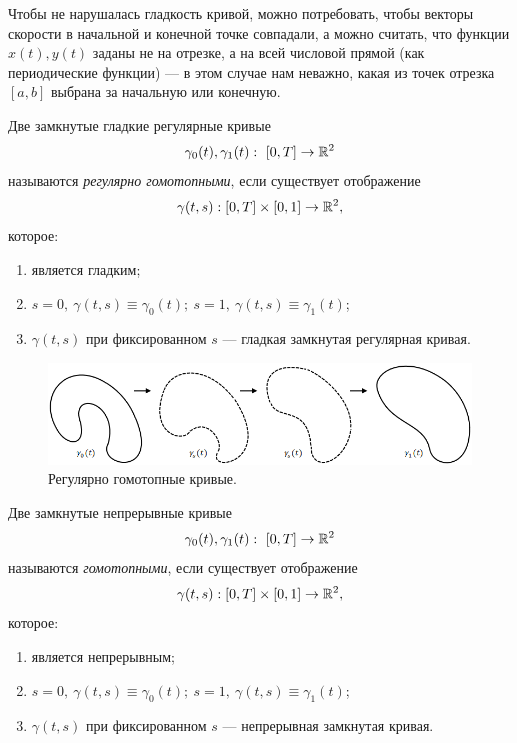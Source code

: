 \begin{remark}
    Чтобы не нарушалась гладкость кривой, можно потребовать, чтобы векторы скорости в начальной и конечной точке совпадали, а можно считать, что функции $x(t), y(t)$ заданы не на отрезке, а на всей числовой прямой (как периодические функции) — в этом случае нам неважно, какая из точек отрезка $[a,b]$ выбрана за начальную или конечную.
\end{remark}

\begin{definition}
    Две замкнутые гладкие регулярные кривые $$\gamma_0(t), \gamma_1(t): \ [0, T] \to \mathbb{R}^2$$ называются \textit{регулярно гомотопными}, если существует отображение $$\gamma(t,s): [0, T] \times [0,1] \to \mathbb{R}^2,$$ которое:
    \begin{enumerate}
        \item является гладким;
        \item $s = 0, \ \gamma(t,s) \equiv \gamma_0(t); \ s = 1,\ \gamma(t,s) \equiv \gamma_1(t)$;
        \item $\gamma(t,s)$ при фиксированном $s$ — гладкая замкнутая регулярная кривая.
    \end{enumerate}
\end{definition} 

\begin{figure}[ht]
    \centering
    \includegraphics[scale=0.5]{images/c12.4.png}
    \caption{Регулярно гомотопные кривые.}
    \label{fig:c12.4}
\end{figure}

\begin{definition}
    Две замкнутые непрерывные кривые $$\gamma_0(t), \gamma_1(t): \ [0, T] \to \mathbb{R}^2$$ называются \textit{гомотопными}, если существует отображение $$\gamma(t,s): [0, T] \times [0,1] \to \mathbb{R}^2,$$ которое:
    \begin{enumerate}
        \item является непрерывным;
        \item $s = 0, \ \gamma(t,s) \equiv \gamma_0(t); \ s = 1,\ \gamma(t,s) \equiv \gamma_1(t)$;
        \item $\gamma(t,s)$ при фиксированном $s$ — непрерывная замкнутая кривая.
    \end{enumerate}
\end{definition} 

